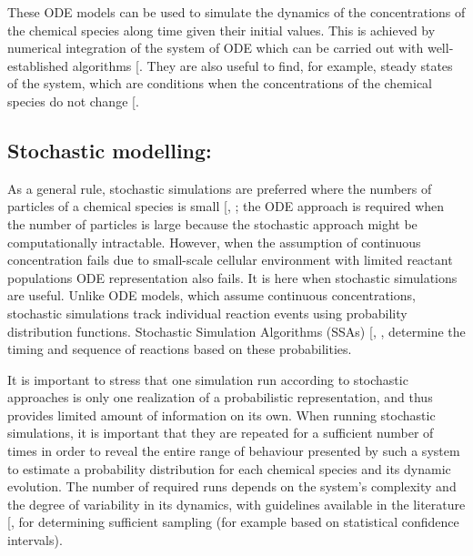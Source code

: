 \documentclass[
  11pt,
  letterpaper,
]{scrreprt}
\begin{document}
These ODE models can be used to simulate the dynamics of the
concentrations of the chemical species along time given their initial
values. This is achieved by numerical integration of the system of ODE
which can be carried out with well-established algorithms
{[}\citeproc{ref-postawa2020Comprehensive}{276}{]}. They are also useful
to find, for example, steady states of the system, which are conditions
when the concentrations of the chemical species do not change
{[}\citeproc{ref-maly2009Introduction}{277}{]}.

\subsection*{Stochastic modelling:}\label{stochastic-modelling}

As a general rule, stochastic simulations are preferred where the
numbers of particles of a chemical species is small
{[},
\citeproc{ref-gillespie2007Stochastic}{278}{]}; the ODE approach is
required when the number of particles is large because the stochastic
approach might be computationally intractable. However, when the
assumption of continuous concentration fails due to small-scale cellular
environment with limited reactant populations ODE representation also
fails. It is here when stochastic simulations are useful. Unlike ODE
models, which assume continuous concentrations, stochastic simulations
track individual reaction events using probability distribution
functions. Stochastic Simulation Algorithms (SSAs)
{[},
\citeproc{ref-gillespie2007Stochastic}{278}{]}, determine the timing and
sequence of reactions based on these probabilities.

It is important to stress that one simulation run according to
stochastic approaches is only one realization of a probabilistic
representation, and thus provides limited amount of information on its
own. When running stochastic simulations, it is important that they are
repeated for a sufficient number of times in order to reveal the entire
range of behaviour presented by such a system to estimate a probability
distribution for each chemical species and its dynamic evolution. The
number of required runs depends on the system's complexity and the
degree of variability in its dynamics, with guidelines available in the
literature {[},
\citeproc{ref-byrne2013How}{280}{]} for determining sufficient sampling
(for example based on statistical confidence intervals).
\end{document}
